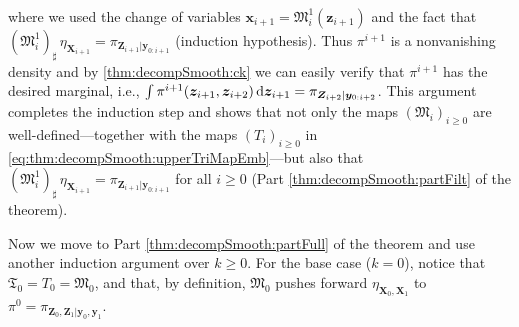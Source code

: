 \documentclass[twoside,11pt]{article}
\newcommand{\push}{_\sharp}                                      %
\newcommand{\Xb}{\boldsymbol{X}}
\newcommand{\xb}{\boldsymbol{x}}
\newcommand{\yb}{\boldsymbol{y}}
\newcommand{\Zb}{\boldsymbol{Z}}
\newcommand{\zb}{\boldsymbol{z}}
\newcommand{\submap}{\mathfrak{M}}
\begin{document}
where we used the change of variables 
$\xb_{i+1} = \submap_{i}^1(\zb_{i+1})$ and the fact that
$(\submap_i^1)\push \, \eta_{\Xb_{i+1}} = \pi_{\Zb_{i+1}\vert\yb_{0:i+1}}$ 
(induction hypothesis).
Thus 
%
$\pi^{i+1}$ is a nonvanishing density
and
by \eqref{thm:decompSmooth:ck}  we can easily verify that $\pi^{i+1}$ has the
desired marginal, i.e., 
$\int \pi^{i+1}(\zb_{i+1},\zb_{i+2}) \, {\rm d}\zb_{i+1} =  
\pi_{\Zb_{i+2} \vert \yb_{0:i+2}}$. 
%
This argument completes the induction step  and shows that not only the maps
$(\submap_i)_{i \ge 0}$ are well-defined---together with the maps $(T_i)_{i \ge 0}$ in 
\eqref{eq:thm:decompSmooth:upperTriMapEmb}---but also that
$(\submap_i^1)\push \, \eta_{\Xb_{i+1}} = \pi_{\Zb_{i+1}\vert\yb_{0:i+1}}$
for all $i \ge 0$ (Part \ref{thm:decompSmooth:partFilt} of the theorem).
%

Now we move to Part \ref{thm:decompSmooth:partFull} of the theorem and
use another induction 
argument over $k\ge 0$. 
For the base case ($k=0$), notice that
$\mathfrak{T}_0 = T_0 = \submap_0$, and that, by definition,
$\submap_0$ pushes forward $\eta_{\Xb_{0},\Xb_{1}}$ to 
$\pi^0 = \pi_{\Zb_0,\Zb_1\vert \yb_0, \yb_1}$.
\end{document}
